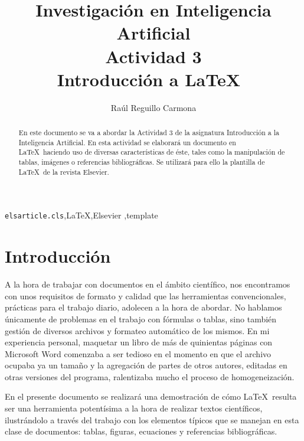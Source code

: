 \documentclass[review]{elsarticle}
\begin{document}
\begin{frontmatter}

\title{Investigaci\'on en Inteligencia Artificial\\Actividad 3\\Introducci\'on a \LaTeX\ }

\author{Ra\'ul Reguillo Carmona}


\begin{abstract}
  En este documento se va a abordar la Actividad 3 de la asignatura Introducción a la Inteligencia Artificial. En esta actividad se elaborará un documento en \LaTeX\ haciendo uso de diversas características de éste, tales como la manipulación de tablas, imágenes o referencias bibliográficas. Se utilizará para ello la plantilla de \LaTeX\ de la revista Elsevier. 
\end{abstract}

\begin{keyword}
\texttt{elsarticle.cls}\sep \LaTeX\sep Elsevier \sep template
\end{keyword}

\end{frontmatter}

\linenumbers

\section{Introducción}

A la hora de trabajar con documentos en el ámbito científico, nos encontramos con unos requisitos de formato y calidad que las herramientas convencionales, prácticas para el trabajo diario, adolecen a la hora de abordar. No hablamos únicamente de problemas en el trabajo con fórmulas o tablas, sino también gestión de diversos archivos y formateo automático de los mismos. En mi experiencia personal, maquetar un libro de más de quinientas páginas con Microsoft Word comenzaba a ser tedioso en el momento en que el archivo ocupaba ya un tamaño y la agregación de partes de otros autores, editadas en otras versiones del programa, ralentizaba mucho el proceso de homogeneización. 

En el presente documento se realizará una demostración de cómo \LaTeX\ resulta ser una herramienta potentísima a la hora de realizar textos científicos, ilustrándolo a través del trabajo con los elementos típicos que se manejan en esta clase de documentos: tablas, figuras, ecuaciones y referencias bibliográficas.
\end{document}
